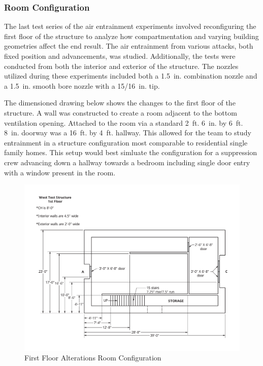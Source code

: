 \documentclass{article}
\begin{document}
\clearpage

\subsubsection{Room Configuration}

The last test series of the air entrainment experiments involved reconfiguring the first floor of the structure to analyze how compartmentation and varying building geometries affect the end result. The air entrainment from various attacks, both fixed position and advancements, was studied. Additionally, the tests were conducted from both the interior and exterior of the structure. The nozzles utilized during these experiments included both a 1.5~in. combination nozzle and a 1.5~in. smooth bore nozzle with a 15/16~in. tip.

The dimensioned drawing below shows the changes to the first floor of the structure. A wall was constructed to create a room adjacent to the bottom ventilation opening. Attached to the room via a standard 2~ft. 6~in. by 6~ft. 8~in. doorway was a 16~ft. by 4~ft. hallway. This allowed for the team to study entrainment in a structure configuration most comparable to residential single family homes. This setup would best simluate the configuration for a suppression crew advancing down a hallway towards a bedroom including single door entry with a window present in the room. 

\begin{figure}[!ht]
	\centering
	\includegraphics[width=6in]{Figures/Air_Entrainment/West_Test_Structure_1st_Floor_nodim.pdf}
	\caption{First Floor Alterations Room Configuration}
	\label{fig:First_Floor_Alterations_Room_Configuration}
\end{figure}
\end{document}
